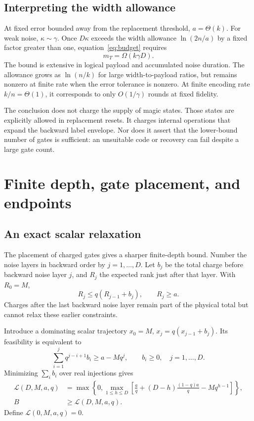 \documentclass[11pt,a4paper]{article}
\numberwithin{equation}{section}
\theoremstyle{remark}\newtheorem*{remark}{Interpretation}
\begin{document}
\subsection{Interpreting the width allowance}
At fixed error bounded away from the replacement threshold, $a=\Theta(k)$. For weak noise, $\kappa\sim\gamma$. Once $D\kappa$ exceeds the width allowance $\ln(2n/a)$ by a fixed factor greater than one, equation~\eqref{eq:budget} requires
\begin{equation}
m_T=\Omega(k\gamma D).
\end{equation}
The bound is extensive in logical payload and accumulated noise duration. The allowance grows as $\ln(n/k)$ for large width-to-payload ratios, but remains nonzero at finite rate when the error tolerance is nonzero. At finite encoding rate $k/n=\Theta(1)$, it corresponds to only $O(1/\gamma)$ rounds at fixed fidelity.

The conclusion does not charge the supply of magic states. Those states are explicitly allowed in replacement resets. It charges internal operations that expand the backward label envelope. Nor does it assert that the lower-bound number of gates is sufficient: an unsuitable code or recovery can fail despite a large gate count.

\section{Finite depth, gate placement, and endpoints}
\subsection{An exact scalar relaxation}
The placement of charged gates gives a sharper finite-depth bound. Number the noise layers in backward order by $j=1,\ldots,D$. Let $b_j$ be the total charge before backward noise layer $j$, and $R_j$ the expected rank just after that layer. With $R_0=M$,
\begin{equation}
R_j\le q(R_{j-1}+b_j),\qquad R_j\ge a.
\end{equation}
Charges after the last backward noise layer remain part of the physical total but cannot relax these earlier constraints.

Introduce a dominating scalar trajectory $x_0=M$, $x_j=q(x_{j-1}+b_j)$. Its feasibility is equivalent to
\begin{equation}
\sum_{i=1}^j q^{j-i+1}b_i\ge a-Mq^j,
\qquad b_i\ge0,\quad j=1,\ldots,D.
\label{eq:scalar}
\end{equation}
Minimizing $\sum_i b_i$ over real injections gives
\begin{align}
\mathcal L(D,M,a,q)
&=\max\left\{0,\max_{1\le h\le D}
\left[\frac aq+(D-h)\frac{(1-q)a}{q}-Mq^{h-1}\right]\right\},
\label{eq:exact}\\
B&\ge\mathcal L(D,M,a,q).
\end{align}
Define $\mathcal L(0,M,a,q)=0$.
\end{document}
